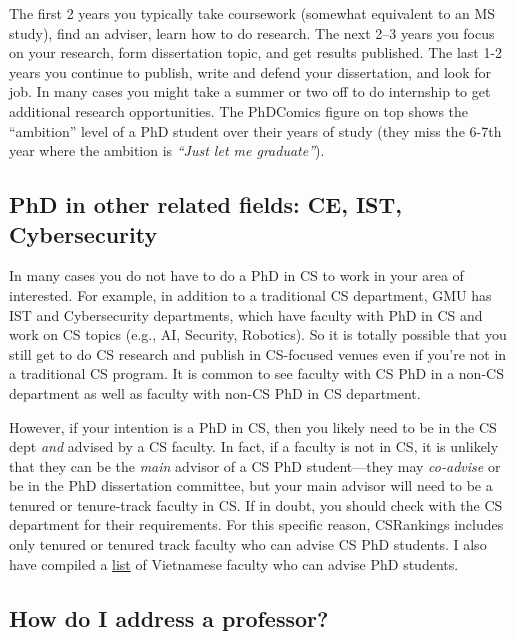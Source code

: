 \documentclass[11pt]{article}
\begin{document}
    The first 2 years you typically take coursework (somewhat equivalent to an MS study), find an adviser, learn how to do research.  The next 2--3 years you focus on your research, form dissertation topic, and get results published. The last 1-2 years you continue to publish, write and defend your dissertation, and look for job. 
    In many cases you might take a summer or two off to do internship to get additional research opportunities.
    The PhDComics figure on top shows the ``ambition'' level of a PhD student over their years of study (they miss the 6-7th year where the ambition is \emph{``Just let me graduate''}).

\subsection{PhD in other related fields: CE, IST, Cybersecurity}

In many cases you do not have to do a PhD in CS to work in your area of interested. For example, in addition to a traditional CS department, GMU has IST and Cybersecurity departments, which have faculty  with PhD in CS and work on CS topics (e.g., AI, Security, Robotics).  So it is totally possible that you still get to do CS research and publish in CS-focused venues even if you're not in a traditional CS program.  It is  common to see faculty with CS PhD in a non-CS department as well as faculty with non-CS PhD in CS department.  

However, if your intention is a PhD in CS, then you likely need to be in the CS dept \emph{and} advised by a CS faculty. In fact, if a faculty is not in CS, it is unlikely that they can be the \emph{main} advisor of a CS PhD student---they may \emph{co-advise} or be in the PhD dissertation committee, but your main advisor will need to be a tenured or tenure-track faculty in CS. If in doubt, you should check with the CS department for their requirements.  For this specific reason,  CSRankings includes only tenured or tenured track faculty who can advise CS PhD students. I also have compiled a \href{https://github.com/dynaroars/dynaroars.github.io/wiki/Viet-CS-Profs-US}{list} of Vietnamese faculty who can advise PhD students. 

\subsection{How do I address a professor?}
\end{document}
